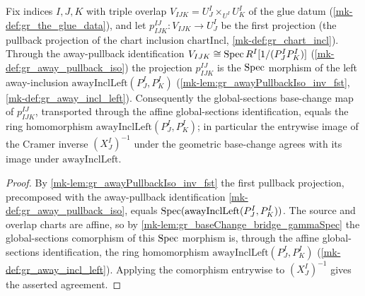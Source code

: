 \begin{lemma}\label{mk-lem:gr_baseChange_bridge_left}
  \leanok

  Fix indices \(I, J, K\) with triple overlap \(V_{IJK} = U^I_J \times_{U^I} U^I_K\) of the glue
  datum (\ref{mk-def:gr_the_glue_data}), and let
  \(p^{IJ}_{IJK} : V_{IJK} \to U^I_J\) be the first projection (the pullback projection of the
  chart inclusion \(\mathrm{chartIncl}\), \ref{mk-def:gr_chart_incl}). Through the away-pullback
  identification \(V_{IJK} \cong \operatorname{Spec} R^I[1/(P^I_J P^I_K)]\) (\ref{mk-def:gr_away_pullback_iso})
  the projection \(p^{IJ}_{IJK}\) is the \(\operatorname{Spec}\) morphism of the left away-inclusion
  \(\mathrm{awayInclLeft}(P^I_J, P^I_K)\) (\ref{mk-lem:gr_awayPullbackIso_inv_fst},
  \ref{mk-def:gr_away_incl_left}). Consequently the global-sections base-change map of
  \(p^{IJ}_{IJK}\), transported through the affine global-sections identification, equals the
  ring homomorphism \(\mathrm{awayInclLeft}(P^I_J, P^I_K)\); in particular the entrywise image of
  the Cramer inverse \((X^I_J)^{-1}\) under the geometric base-change agrees with its image under
  \(\mathrm{awayInclLeft}\).
\end{lemma}
\begin{proof}
  By \ref{mk-lem:gr_awayPullbackIso_inv_fst} the first pullback projection, precomposed with the
  away-pullback identification \ref{mk-def:gr_away_pullback_iso}, equals
  \(\operatorname{Spec}(\mathrm{awayInclLeft}(P^I_J, P^I_K))\). The source and overlap charts are affine, so by
  \ref{mk-lem:gr_baseChange_bridge_gammaSpec} the global-sections comorphism of this \(\operatorname{Spec}\)
  morphism is, through the affine global-sections identification, the ring homomorphism
  \(\mathrm{awayInclLeft}(P^I_J, P^I_K)\) (\ref{mk-def:gr_away_incl_left}). Applying the comorphism
  entrywise to \((X^I_J)^{-1}\) gives the asserted agreement.
\end{proof}


